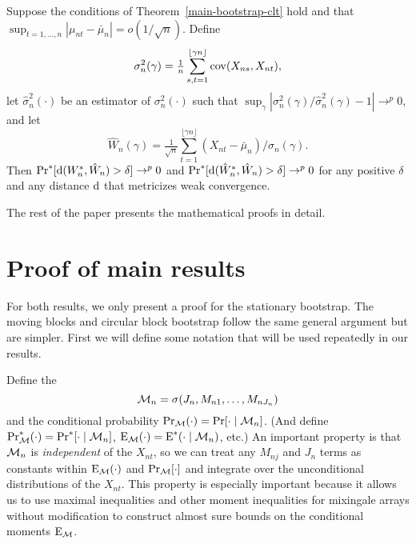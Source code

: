 \documentclass[11pt]{article}
\begin{document}
\begin{cor}
  Suppose the conditions of Theorem~\ref{main-bootstrap-clt} hold and
  that $\sup_{t=1,\dots,n}|\mu_{nt} - \bar \mu_n| = o(1/\sqrt{n})$. Define
  \begin{equation}
    \label{eq:8}
    \sigma_n^2(\gamma) = \tfrac{1}{n}
    \sum_{s,t=1}^{\lfloor \gamma n \rfloor} \operatorname{cov}(X_{ns}, X_{nt}),
  \end{equation}
  let $\hat\sigma_n^2(\cdot)$ be an estimator of $\sigma_n^2(\cdot)$
  such that $\sup_{\gamma} |\sigma_n^2(\gamma) /
  \hat{\sigma}_n^2(\gamma) - 1| \to^p 0$, and let
  \begin{equation}
    \label{eq:9}
    \hat{W}_n(\gamma) = \tfrac{1}{\sqrt{n}} \sum_{t=1}^{\lfloor \gamma
      n \rfloor} (X_{nt} - \bar\mu_n) / \hat{\sigma}_{n}(\gamma).
  \end{equation}
  Then $\operatorname{Pr}^{*}[\operatorname{d}(W_n^{*}, \hat{W}_n) > \delta] \to^p 0$ and
  $\operatorname{Pr}^{*}[\operatorname{d}(\hat{W}_n^{*}, \hat{W}_n) > \delta] \to^p 0$ for any
  positive $\delta$ and any distance $\operatorname{d}$ that metricizes weak
  convergence.
\end{cor}

The rest of the paper presents the mathematical proofs in detail.

\appendix
\section{Proof of main results}

For both results, we only present a proof for the stationary
bootstrap. The moving blocks and circular block bootstrap follow the
same general argument but are simpler. First we will define some
notation that will be used repeatedly in our results.

Define the \sigmafield
\begin{equation}
  \mathcal{M}_n = \sigma(J_{n}, M_{n1},\dots,M_{nJ_n})
\end{equation}
and the conditional probability $\operatorname{Pr}_{\mathcal{M}}(\cdot) = \operatorname{Pr}[\cdot \mid \mathcal{M}_n]$.
(And define $\operatorname{Pr}_{\mathcal{M}}^*(\cdot) = \operatorname{Pr}^*[\cdot \mid \mathcal{M}_n]$, $\operatorname{E}_{\mathcal{M}}(\cdot) =
\operatorname{E}^*(\cdot \mid \mathcal{M}_n)$, etc.) An important property is
that $\mathcal{M}_n$ is \emph{independent} of the $X_{nt}$, so we can treat any
$M_{nj}$ and $J_n$ terms as constants within $\operatorname{E}_{\mathcal{M}}(\cdot)$ and
$\operatorname{Pr}_{\mathcal{M}}[\cdot]$ and integrate over the unconditional distributions of the
$X_{nt}$. This property is especially important because it allows us
to use maximal inequalities and other moment inequalities for
mixingale arrays without modification to construct almost sure bounds on the
conditional moments $\operatorname{E}_{\mathcal{M}}$.
\end{document}
